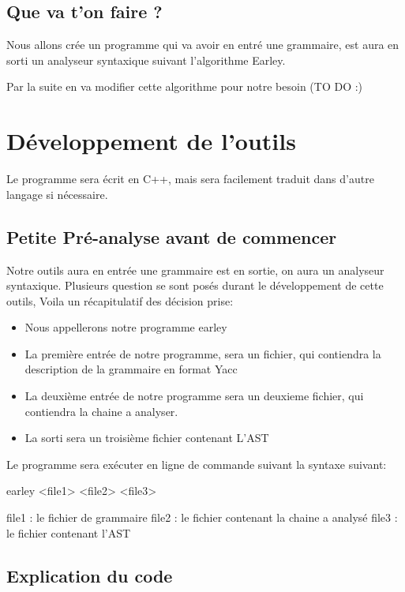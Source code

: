 \documentclass[10pt]{report}
\begin{document}
\section{Que va t'on faire ?}
Nous allons crée un programme qui va avoir en entré une grammaire, est aura en sorti un analyseur syntaxique suivant l'algorithme Earley.

Par la suite en va modifier cette algorithme pour notre besoin (TO DO :)

\chapter{Développement de l'outils}
Le programme sera écrit en C++, mais sera facilement traduit dans d'autre langage si nécessaire.
\section{Petite Pré-analyse avant de commencer}
Notre outils aura en entrée une grammaire est en sortie, on aura un analyseur syntaxique. Plusieurs question se sont posés durant le développement de cette outils, Voila un récapitulatif des décision prise:
\begin{itemize}
	\item Nous appellerons notre programme earley
	\item La première entrée de notre programme, sera un fichier, qui contiendra la description de la grammaire en format Yacc
	\item La deuxième entrée de notre programme sera un deuxieme fichier, qui contiendra la chaine a analyser.
	\item La sorti sera un troisième fichier contenant L'AST
\end{itemize}

Le programme sera exécuter en ligne de commande suivant la syntaxe suivant: 

earley <file1> <file2> <file3>

file1 : le fichier de grammaire
file2 : le fichier contenant la chaine a analysé
file3 : le fichier contenant l'AST

\section{Explication du code}
\end{document}
